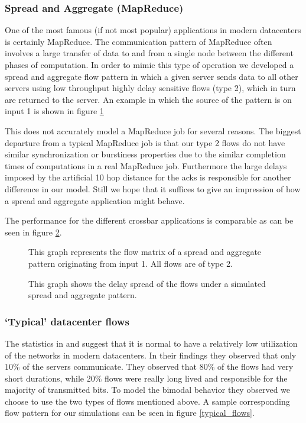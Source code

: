 \documentclass{IEEEtran}%
\begin{document}
\subsubsection{Spread and Aggregate (MapReduce)}
One of the most famous (if not most popular) applications in modern datacenters is certainly MapReduce.  The communication pattern of MapReduce often involves a large transfer of data to and from a single node between the different phases of computation.  In order to mimic this type of operation we developed a spread and aggregate flow pattern in which a given server sends data to all other servers using low throughput highly delay sensitive flows (type 2), which in turn are returned to the server.   An example in which the source of the pattern is on input 1 is shown in figure \ref{spreadagg}

This does not accurately model a MapReduce job for several reasons.  The biggest departure from a typical MapReduce job is that our type 2 flows do not have similar synchronization or burstiness properties due to the similar completion times of computations in a real MapReduce job.  Furthermore the large delays imposed by the artificial 10 hop distance for the acks is responsible for another difference in our model.  Still we hope that it suffices to give an impression of how a spread and aggregate application might behave.

The performance for the different crossbar applications is comparable as can be seen in figure \ref{spreadagg_delay_spread}.

\begin{figure}%
	\caption{This graph represents the flow matrix of a spread and aggregate pattern originating from input 1.  All flows are of type 2.}
	\label{spreadagg}
\end{figure}

\begin{figure}%
	\caption{This graph shows the delay spread of the flows under a simulated spread and aggregate pattern.}
	\label{spreadagg_delay_spread}
\end{figure}

\subsubsection{`Typical' datacenter flows}
The statistics in \cite{Benson} and \cite{Kandula} suggest that it is normal to have a relatively low utilization of the networks in modern datacenters.  In their findings they observed that only $10\%$ of the servers communicate.  They observed that $80\%$ of the flows had very short durations, while $20\%$ flows were really long lived and responsible for the majority of transmitted bits.  To model the bimodal behavior they observed we choose to use the two types of flows mentioned above.  A sample corresponding flow pattern for our simulations can be seen in figure \ref{typical_flows}.
\end{document}
